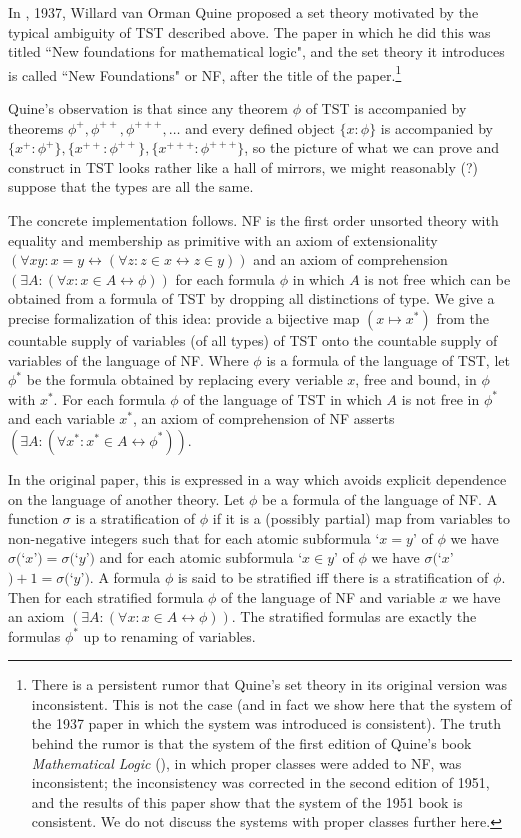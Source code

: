 \documentclass[112pt]{article}
\begin{document}
In \cite{nf}, 1937, Willard van Orman Quine proposed a set theory motivated by the typical ambiguity of TST described above.  The paper in which he did this was titled ``New foundations for mathematical logic", and the set theory it introduces is called ``New Foundations" or NF, after the title of the paper.\footnote{There is a persistent rumor that Quine's set theory in its original version was inconsistent.  This is not the case (and in fact we show here that the system of the 1937 paper in which the system was introduced is consistent).  The truth behind the rumor is that the system of the first edition of Quine's book {\em Mathematical Logic\/} (\cite{ml}), in which proper classes were added to NF, was inconsistent;  the inconsistency was corrected in the second edition of 1951, and the results of this paper show that the system of the 1951 book is consistent.  We do not discuss the systems with proper classes further here.}

Quine's observation is that since any theorem $\phi$ of TST is accompanied by theorems $\phi^+, \phi^{++}, \phi^{+++}, \ldots$ and every defined object $\{x:\phi\}$ is accompanied by
$\{x^+:\phi^+\},\{x^{++}:\phi^{++}\},\{x^{+++}:\phi^{+++}\}$, so the picture of what we can prove and construct in TST looks rather like a hall of mirrors, we might reasonably (?) suppose that the types are all the same.

The concrete implementation follows.  NF is the first order unsorted theory with equality and membership as primitive with an axiom of extensionality $(\forall xy:x=y \leftrightarrow (\forall z:z \in x \leftrightarrow z\in y))$ and an axiom of comprehension $(\exists A:(\forall x:x \in A \leftrightarrow \phi))$ for each formula $\phi$ in which $A$ is not free which can be obtained from a formula of TST by dropping all distinctions of type.  We give a precise formalization of this idea:  provide a bijective map $(x \mapsto x^*)$ from the countable supply of variables (of all types) of TST onto the countable supply of variables of the language of NF.  Where $\phi$ is a formula of the language of TST, let $\phi^*$ be the formula obtained by replacing every veriable $x$, free and bound,
in $\phi$ with $x^*$. For each formula $\phi$ of the language of TST in which $A$ is not free in $\phi^*$ and each variable $x^*$, an axiom of comprehension of NF asserts $(\exists A:(\forall x^*:x^* \in A \leftrightarrow \phi^*))$.

In the original paper, this is expressed in a way which avoids explicit dependence on the language of another theory.  Let $\phi$ be a formula of the language of
NF.  A function $\sigma$ is a stratification of $\phi$ if it is a (possibly partial) map from variables to non-negative integers such that for each atomic subformula
`$x=y$'  of $\phi$ we have $\sigma($`$x$'$)=\sigma($`$y$'$)$ and for each atomic subformula `$x \in y$' of $\phi$ we have $\sigma($`$x$'$)+1 = \sigma($`$y$'$)$.
A formula $\phi$ is said to be stratified iff there is a stratification of $\phi$.  Then for each stratified formula $\phi$ of the language of NF and variable $x$ we have an axiom $(\exists A:(\forall x:x \in A \leftrightarrow \phi))$.  The stratified formulas are exactly the formulas $\phi^*$ up to renaming of variables.
\end{document}

